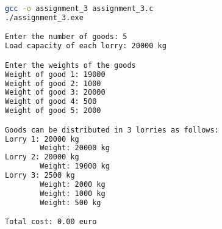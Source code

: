 \documentclass{article}
\begin{document}
\begin{enumerate}
	      \begin{lstlisting}[language=bash,caption={Example of compiling and running \texttt{assignment\_3.c} in \emph{Ubuntu}, input size $n=5$.},label={lst:code2}]
gcc -o assignment_3 assignment_3.c
./assignment_3.exe

Enter the number of goods: 5
Load capacity of each lorry: 20000 kg 

Enter the weights of the goods 
Weight of good 1: 19000
Weight of good 2: 1000
Weight of good 3: 20000
Weight of good 4: 500
Weight of good 5: 2000

Goods can be distributed in 3 lorries as follows:
Lorry 1: 20000 kg
        Weight: 20000 kg
Lorry 2: 20000 kg
        Weight: 19000 kg
Lorry 3: 2500 kg
        Weight: 2000 kg
        Weight: 1000 kg
        Weight: 500 kg

Total cost: 0.00 euro
\end{lstlisting}
\end{enumerate}
\end{document}

